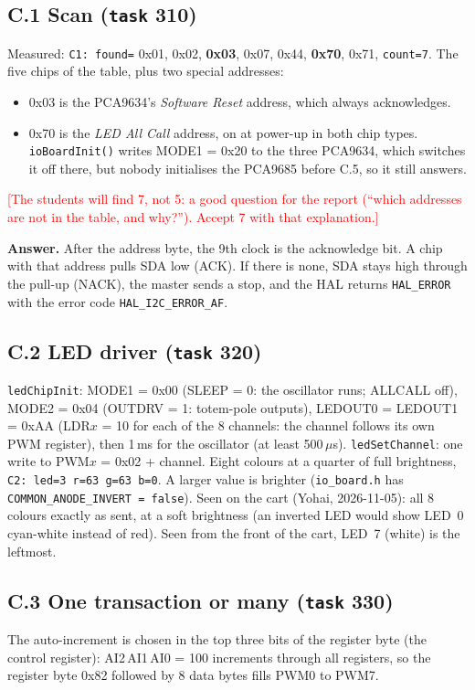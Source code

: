 \documentclass[11pt,a4paper]{article}
\newcommand{\lv}[1]{\texttt{#1}}                 %
\newcommand{\flag}[1]{\textcolor{red}{[#1]}}
\begin{document}
\subsection*{C.1 Scan (\lv{task} 310)}
Measured: \texttt{C1: found=} 0x01, 0x02, \textbf{0x03}, 0x07, 0x44, \textbf{0x70}, 0x71, \texttt{count=7}. The five
chips of the table, plus two special addresses:
\begin{itemize}
  \item 0x03 is the PCA9634's \emph{Software Reset} address, which always acknowledges.
  \item 0x70 is the \emph{LED All Call} address, on at power-up in both chip types. \texttt{ioBoardInit()} writes
        MODE1 = 0x20 to the three PCA9634, which switches it off there, but nobody initialises the PCA9685 before
        C.5, so it still answers.
\end{itemize}
\flag{The students will find 7, not 5: a good question for the report (``which addresses are not in the table, and
why?''). Accept 7 with that explanation.}

\textbf{Answer.} After the address byte, the 9th clock is the acknowledge bit. A chip with that address pulls SDA low
(ACK). If there is none, SDA stays high through the pull-up (NACK), the master sends a stop, and the HAL returns
\texttt{HAL\_ERROR} with the error code \texttt{HAL\_I2C\_ERROR\_AF}.

\subsection*{C.2 LED driver (\lv{task} 320)}
\texttt{ledChipInit}: MODE1 = 0x00 (SLEEP = 0: the oscillator runs; ALLCALL off), MODE2 = 0x04 (OUTDRV = 1:
totem-pole outputs), LEDOUT0 = LEDOUT1 = 0xAA (LDR$x$ = 10 for each of the 8 channels: the channel follows its own
PWM register), then 1\,ms for the oscillator (at least 500\,$\mu$s). \texttt{ledSetChannel}: one write to
PWM$x$ = 0x02 + channel. Eight colours at a quarter of full brightness, \texttt{C2: led=3 r=63 g=63 b=0}. A larger value is brighter (\texttt{io\_board.h} has \texttt{COMMON\_ANODE\_INVERT = false}).
Seen on the cart (Yohai, 2026-11-05): all 8 colours exactly as sent, at a soft brightness (an inverted LED would
show LED~0 cyan-white instead of red). Seen from the front of the cart, LED~7 (white) is the leftmost.

\subsection*{C.3 One transaction or many (\lv{task} 330)}
The auto-increment is chosen in the top three bits of the register byte (the control register): AI2\,AI1\,AI0 = 100
increments through all registers, so the register byte 0x82 followed by 8 data bytes fills PWM0 to PWM7.
\end{document}
